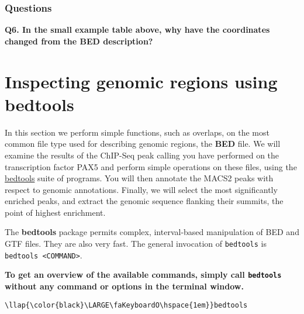 \documentclass[11pt]{article}
\begin{document}
    \hypertarget{questions}{%
\subsubsection{Questions}\label{questions}}

\textbf{Q6. In the small example table above, why have the coordinates
changed from the BED description?}




\newpage





    \hypertarget{inspecting-genomic-regions-using-bedtools}{%
\section{Inspecting genomic regions using
bedtools}\label{inspecting-genomic-regions-using-bedtools}}

In this section we perform simple functions, such as overlaps, on the
most common file type used for describing genomic regions, the
\textbf{BED} file. We will examine the results of the ChIP-Seq peak
calling you have performed on the transcription factor PAX5 and perform
simple operations on these files, using the
\href{https://bedtools.readthedocs.io/en/latest/}{bedtools} suite of
programs. You will then annotate the MACS2 peaks with respect to genomic
annotations. Finally, we will select the most significantly enriched
peaks, and extract the genomic sequence flanking their summits, the
point of highest enrichment.

    The \textbf{bedtools} package permits complex, interval-based
manipulation of BED and GTF files. They are also very fast. The general
invocation of \texttt{bedtools} is
\texttt{bedtools\ \textless{}COMMAND\textgreater{}}.

\textbf{To get an overview of the available commands, simply call
\texttt{bedtools} without any command or options in the terminal
window.}





\begin{terminalinput}
\begin{Verbatim}[commandchars=\\\{\}]
\llap{\color{black}\LARGE\faKeyboardO\hspace{1em}}bedtools
\end{Verbatim}
\end{terminalinput}
\end{document}
